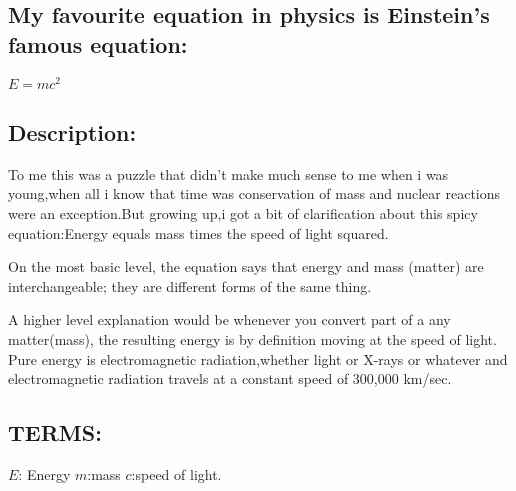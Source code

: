\subsection{My favourite equation in physics is Einstein's famous equation:} 

$E=mc^2$

\subsection{Description:}
To me this was a puzzle that didn't make much sense to me when i was young,when all i know that time was conservation of mass and nuclear reactions were an exception.But growing up,i got a bit of clarification about this spicy equation:Energy equals mass times the speed of light squared.

On the most basic level, the equation says that energy and mass (matter) are interchangeable; they are different forms of the same thing.

A higher level explanation would be whenever you convert part of a any matter(mass), the resulting energy is by definition moving at the speed of light. Pure energy is electromagnetic radiation,whether light or X-rays or whatever and electromagnetic radiation travels at a constant speed of 300,000 km/sec.

\subsection{TERMS:}
                       $E$: Energy
                       $m$:mass 
                       $c$:speed of light.
